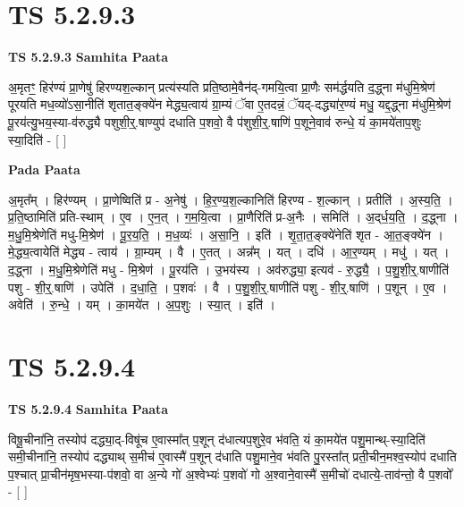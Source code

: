 \documentclass[17pt]{extarticle}
\begin{document}

\section{ TS 5.2.9.3 }

\textbf{TS 5.2.9.3 } \newline
\textbf{Samhita Paata} \newline

अ॒मृतꣳ॒॒ हिर॑ण्यं प्रा॒णेषु॑ हिरण्यश॒ल्कान् प्रत्य॑स्यति प्रति॒ष्ठामे॒वैन॑द्-गमयि॒त्वा प्रा॒णैः सम॑र्द्धयति द॒द्ध्ना म॑धुमि॒श्रेण॑ पूरयति मध॒व्यो॑ऽसा॒नीति॑ शृतात॒ङ्क्ये॑न मेद्ध्य॒त्वाय॑ ग्रा॒म्यं ॅवा ए॒तदन्नं॒ ॅयद्-दद्ध्या॑र॒ण्यं मधु॒ यद्द॒द्ध्ना म॑धुमि॒श्रेण॑ पू॒रय॑त्यु॒भय॒स्या-व॑रुद्ध्यै पशुशी॒र्॒.षाण्युप॑ दधाति प॒शवो॒ वै प॑शुशी॒र्॒.षाणि॑ प॒शूने॒वाव॑ रुन्धे॒ यं का॒मये॑ताप॒शुः स्या॒दिति॑ - [  ] \newline

\textbf{Pada Paata} \newline

अ॒मृत᳚म् । हिर॑ण्यम् । प्रा॒णेष्विति॑ प्र - अ॒नेषु॑ । हि॒र॒ण्य॒श॒ल्कानिति॑ हिरण्य - श॒ल्कान् । प्रतीति॑ । अ॒स्य॒ति॒ । प्र॒ति॒ष्ठामिति॑ प्रति-स्थाम् । ए॒व । ए॒न॒त् । ग॒म॒यि॒त्वा । प्रा॒णैरिति॑ प्र-अ॒नैः । समिति॑ । अ॒द्‌र्ध॒य॒ति॒ । द॒द्ध्ना । म॒धु॒मि॒श्रेणेति॑ मधु-मि॒श्रेण॑ । पू॒र॒य॒ति॒ । म॒ध॒व्यः॑ । अ॒सा॒नि॒ । इति॑ । शृ॒ता॒त॒ङ्क्ये॑नेति॑ शृत - आ॒त॒ङ्क्ये॑न । मे॒द्ध्य॒त्वायेति॑ मेद्ध्य - त्वाय॑ । ग्रा॒म्यम् । वै । ए॒तत् । अन्न᳚म् । यत् । दधि॑ । आ॒र॒ण्यम् । मधु॑ । यत् । द॒द्ध्ना । म॒धु॒मि॒श्रेणेति॑ मधु - मि॒श्रेण॑ । पू॒रय॑ति । उ॒भय॑स्य । अव॑रुद्ध्या॒ इत्यव॑ - रु॒द्ध्यै॒ । प॒शु॒शी॒र्॒.षाणीति॑ पशु - शी॒र्॒.षाणि॑ । उपेति॑ । द॒धा॒ति॒ । प॒शवः॑ । वै । प॒शु॒शी॒र्॒.षाणीति॑ पशु - शी॒र्॒.षाणि॑ । प॒शून् । ए॒व । अवेति॑ । रु॒न्धे॒ । यम् । का॒मये॑त । अ॒प॒शुः । स्या॒त् । इति॑ ।  \newline





\section{ TS 5.2.9.4 }

\textbf{TS 5.2.9.4 } \newline
\textbf{Samhita Paata} \newline

विषू॒चीना॑नि॒ तस्योप॑ दद्ध्या॒द्-विषू॑च ए॒वास्मा᳚त् प॒शून् द॑धात्यप॒शुरे॒व भ॑वति॒ यं का॒मये॑त पशु॒मान्थ्-स्या॒दिति॑ समी॒चीना॑नि॒ तस्योप॑ दद्ध्याथ् स॒मीच॑ ए॒वास्मै॑ प॒शून् द॑धाति पशु॒माने॒व भ॑वति पु॒रस्ता᳚त् प्रती॒चीन॒मश्व॒स्योप॑ दधाति प॒श्चात् प्रा॒चीन॑मृष॒भस्या-प॑शवो॒ वा अ॒न्ये गो॑ अ॒श्वेभ्यः॑ प॒शवो॑ गो अ॒श्वाने॒वास्मै॑ स॒मीचो॑ दधात्ये॒-ताव॑न्तो॒ वै प॒शवो᳚ - [  ] \newline
\end{document}
